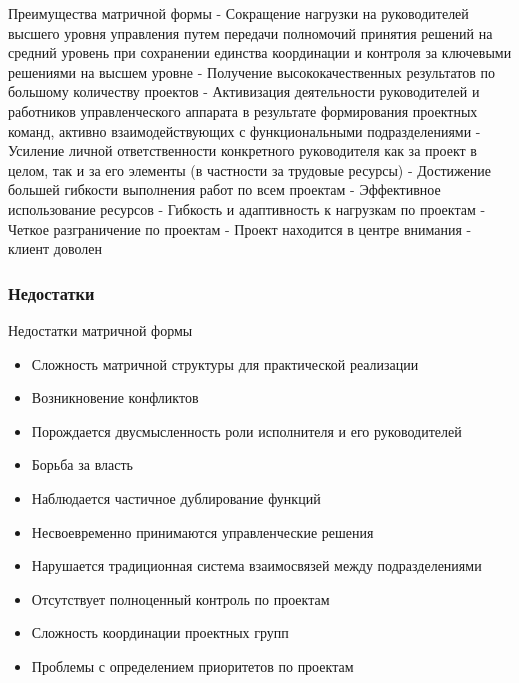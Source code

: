 \documentclass{../industrial-development}
\begin{document}
\begin{}
\lecturenotes
Преимущества матричной формы
- Сокращение нагрузки на руководителей высшего уровня управления путем передачи полномочий принятия решений на средний уровень при сохранении единства координации и контроля за ключевыми решениями на высшем уровне
- Получение высококачественных результатов по большому количеству проектов
- Активизация деятельности руководителей и работников управленческого аппарата в результате формирования проектных команд, активно взаимодействующих с функциональными подразделениями
- Усиление личной ответственности конкретного руководителя как за проект в целом, так и за его элементы (в частности за трудовые ресурсы)
- Достижение большей гибкости выполнения работ по всем проектам
- Эффективное использование ресурсов
- Гибкость и адаптивность к нагрузкам по проектам
- Четкое разграничение по проектам
- Проект находится в центре внимания - клиент доволен

\begin{frame} \frametitle{Недостатки}
  \begin{block}{Недостатки матричной формы}
  \end{block}
  
  \begin{itemize}
  \item Сложность матричной структуры для практической реализации
  \item Возникновение конфликтов
  \item Порождается двусмысленность роли исполнителя и его руководителей
  \item Борьба за власть
  \item Наблюдается частичное дублирование функций
  \item Несвоевременно принимаются управленческие решения
  \item Нарушается традиционная система взаимосвязей между подразделениями
  \item Отсутствует полноценный контроль по проектам
  \item Сложность координации проектных групп
  \item Проблемы  с определением приоритетов по проектам
  \end{itemize}
\end{frame}


\end{}
\end{document}
